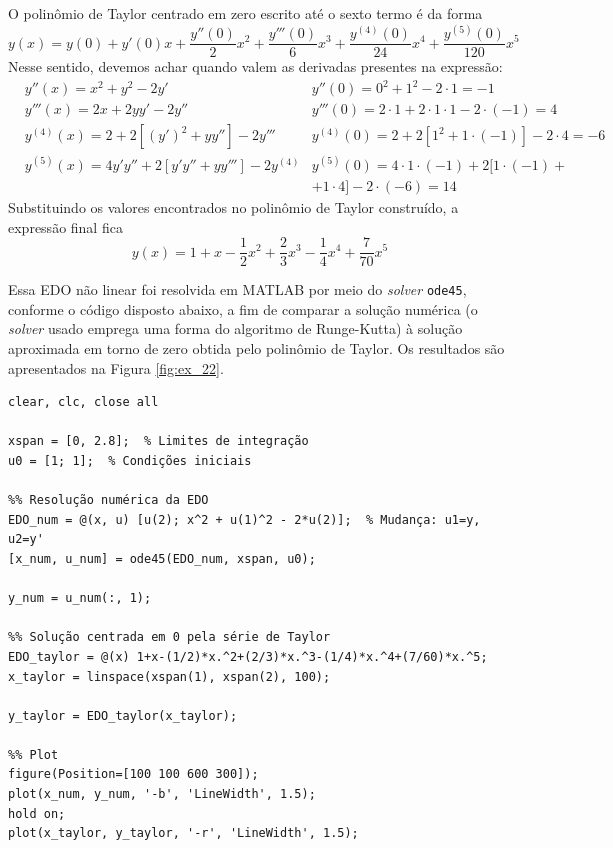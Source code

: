 \documentclass[oneside,12pt,a4paper]{report}
\begin{document}
    \begin{resolucao}
        O polinômio de Taylor centrado em zero escrito até o sexto termo é da forma
        \[y(x)=y(0)+y'(0)x+\frac{y''(0)}{2}x^2+\frac{y'''(0)}{6}x^3+\frac{y^{(4)}(0)}{24}x^4+\frac{y^{(5)}(0)}{120}x^5\]
        Nesse sentido, devemos achar quando valem as derivadas presentes na expressão:
        \begin{align*}
          &y''(x)=x^2+y^2-2y'& y''(0)=0^2+1^2-2\cdot1=-1&\\
          &y'''(x)=2x+2yy'-2y''& y'''(0)=2\cdot 1+2\cdot1\cdot1-2\cdot(-1)=4&\\
          &y^{(4)}(x)=2+2[(y')^2+yy'']-2y'''& y^{(4)}(0)=2+2[1^2+1\cdot(-1)]-2\cdot4=-6&\\
          &y^{(5)}(x)=4y'y''+2[y'y''+yy''']-2y^{(4)}& y^{(5)}(0)=4\cdot1\cdot(-1)+2[1\cdot(-1)+&\\
          & & +1\cdot4]-2\cdot(-6)=14&
        \end{align*}
        Substituindo os valores encontrados no polinômio de Taylor construído, a expressão final fica
        \[\boxed{y(x)=1+x-\frac{1}{2}x^2+\frac{2}{3}x^3-\frac{1}{4}x^4+\frac{7}{70}x^5}\]

        Essa EDO não linear foi resolvida em MATLAB por meio do \textit{solver} \texttt{ode45}, conforme o código disposto abaixo, a fim de comparar a solução numérica (o \textit{solver} usado emprega uma forma do algoritmo de Runge-Kutta) à solução aproximada em torno de zero obtida pelo polinômio de Taylor. Os resultados são apresentados na Figura \ref{fig:ex_22}.

        \begin{lstlisting}
clear, clc, close all

xspan = [0, 2.8];  % Limites de integração
u0 = [1; 1];  % Condições iniciais

%% Resolução numérica da EDO
EDO_num = @(x, u) [u(2); x^2 + u(1)^2 - 2*u(2)];  % Mudança: u1=y, u2=y'
[x_num, u_num] = ode45(EDO_num, xspan, u0);

y_num = u_num(:, 1);

%% Solução centrada em 0 pela série de Taylor
EDO_taylor = @(x) 1+x-(1/2)*x.^2+(2/3)*x.^3-(1/4)*x.^4+(7/60)*x.^5;
x_taylor = linspace(xspan(1), xspan(2), 100);

y_taylor = EDO_taylor(x_taylor);

%% Plot
figure(Position=[100 100 600 300]);
plot(x_num, y_num, '-b', 'LineWidth', 1.5);
hold on;
plot(x_taylor, y_taylor, '-r', 'LineWidth', 1.5);


\end{lstlisting}
\end{resolucao}
\end{document}
